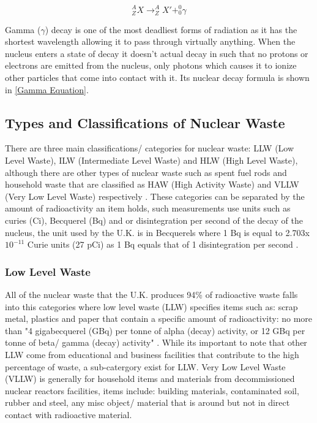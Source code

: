 \begin{equation}
{^A_ZX \rightarrow ^A_ZX' + ^0_0\gamma}
\label{Gamma Equation}
\end{equation} 
\vspace{0.2cm}

Gamma ($\gamma$) decay is one of the most deadliest forms of radiation as it has the shortest wavelength allowing it to pass through virtually anything. When the nucleus enters a state of decay it doesn't actual decay in such that no protons or electrons are emitted from the nucleus, only photons which causes it to ionize other particles that come into contact with it. Its nuclear decay formula is shown in \cref{Gamma Equation}\cite{Decay1}.

\subsection{Types and Classifications of Nuclear Waste}
\label{Types of Nuclear Waste SubSection}

There are three main classifications/ categories for nuclear waste: LLW (Low Level Waste), ILW (Intermediate Level Waste) and HLW (High Level Waste), although there are other types of nuclear waste such as spent fuel rods and household waste that are classified as HAW (High Activity Waste) and VLLW (Very Low Level Waste) respectively  \cite{NuclearWasteTypes}. These categories can be separated by the amount of radioactivity an item holds, such measurements use units such as curies (Ci), Becquerel (Bq) and or disintegration per second of the decay of the nucleus, the unit used by the U.K.  is in Becquerels where 1 Bq is equal to 2.703x$10^{-11}$ Curie units (27 pCi) as 1 Bq equals that of 1 disintegration per second \cite{Units}.

\subsubsection*{Low Level Waste}
\label{Low Level Waste SubSubSection}

All of the nuclear waste that the U.K. produces 94\% of radioactive waste falls into this categories where low level waste (LLW) specifies items such as: scrap metal, plastics and paper that contain a specific amount of radioactivity: no more than "4 gigabecquerel (GBq) per tonne of alpha (decay) activity, or 12 GBq per tonne of beta/ gamma (decay) activity" \cite{NuclearWasteTypes}. While its important to note that other LLW come from educational and business facilities that contribute to the high percentage of waste, a sub-catergory exist for LLW. Very Low Level Waste (VLLW) is generally for household items and materials from decommissioned nuclear reactors facilities, items include: building materials, contaminated soil, rubber and steel, any misc object/ material that is around but not in direct contact with radioactive material. \\

